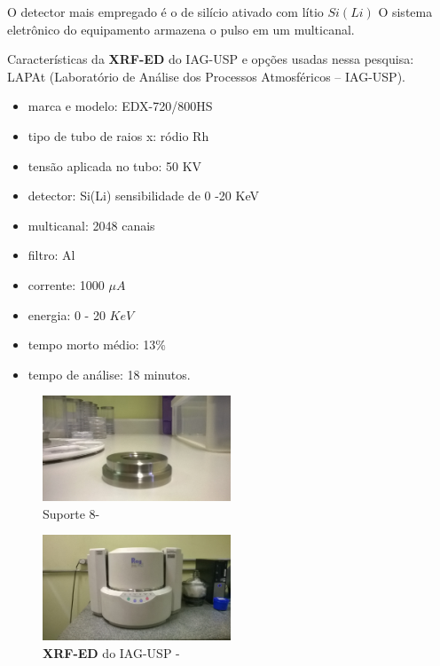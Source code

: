 O detector mais empregado é o de silício ativado com lítio $Si(Li)$ 
O sistema eletrônico do equipamento armazena o pulso em um multicanal.

Características da \textbf{XRF-ED} do IAG-USP e opções usadas nessa pesquisa:
LAPAt (Laboratório de Análise dos Processos Atmosféricos – IAG-USP).
\begin{itemize}
  \item marca e modelo: EDX-720/800HS
  \item tipo de tubo de raios x: ródio Rh
  \item tensão aplicada no tubo: 50 KV 
  \item detector: Si(Li) sensibilidade de 0 -20 KeV
  \item multicanal: 2048 canais
  \item filtro: Al
  \item corrente: 1000 $\mu A$
  \item energia: 0 - 20 $KeV$ 
  \item tempo morto médio: 13\%
  \item tempo de análise: 18 minutos.
\end{itemize}

\begin{figure}[H]
\begin{center}
  \includegraphics[width=0.5\textwidth]{../inputs/images/suporte8.jpg}
  \caption{Suporte 8- \label{fig:suporte8}}
\end{center}
\end{figure}

\begin{figure}[H]
\begin{center}
  \includegraphics[width=0.5\textwidth]{../inputs/images/xrf-ed-IAG-USP.jpg}
  \caption{\textbf{XRF-ED} do IAG-USP - \label{fig:xrfed_iag}}
\end{center}
\end{figure}



